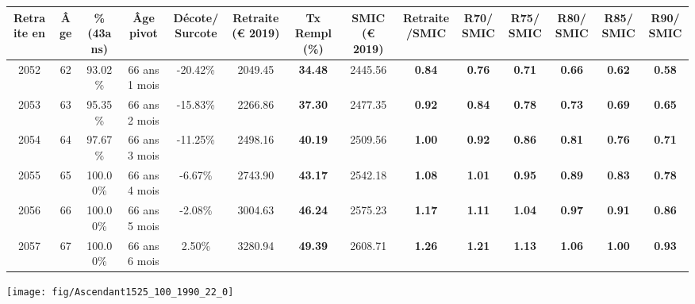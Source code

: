 \begin{adjustbox}{max width=\textwidth} 
\begin{tabular}[htb]{|c|c||c|c|c||c|c||c|c||c|c|c|c|c|} 
\hline 
 Retraite en &  Âge &  \%(43ans) &  Âge pivot &  Décote/Surcote &  Retraite (\euro{} 2019) &  Tx Rempl(\%) &  SMIC (\euro{} 2019) &  Retraite/SMIC &  R70/SMIC &  R75/SMIC &  R80/SMIC &  R85/SMIC &  R90/SMIC \\ 
\hline \hline 
 2052 &  62 &  93.02\% &  66 ans 1 mois &  -20.42\% &  2049.45 &  {\bf 34.48} &  2445.56 &  {\bf {\color{red} 0.84}} &  {\bf {\color{red} 0.76}} &  {\bf {\color{red} 0.71}} &  {\bf {\color{red} 0.66}} &  {\bf {\color{red} 0.62}} &  {\bf {\color{red} 0.58}} \\ 
\hline 
 2053 &  63 &  95.35\% &  66 ans 2 mois &  -15.83\% &  2266.86 &  {\bf 37.30} &  2477.35 &  {\bf {\color{red} 0.92}} &  {\bf {\color{red} 0.84}} &  {\bf {\color{red} 0.78}} &  {\bf {\color{red} 0.73}} &  {\bf {\color{red} 0.69}} &  {\bf {\color{red} 0.65}} \\ 
\hline 
 2054 &  64 &  97.67\% &  66 ans 3 mois &  -11.25\% &  2498.16 &  {\bf 40.19} &  2509.56 &  {\bf {\color{red} 1.00}} &  {\bf {\color{red} 0.92}} &  {\bf {\color{red} 0.86}} &  {\bf {\color{red} 0.81}} &  {\bf {\color{red} 0.76}} &  {\bf {\color{red} 0.71}} \\ 
\hline 
 2055 &  65 &  100.00\% &  66 ans 4 mois &  -6.67\% &  2743.90 &  {\bf 43.17} &  2542.18 &  {\bf 1.08} &  {\bf 1.01} &  {\bf {\color{red} 0.95}} &  {\bf {\color{red} 0.89}} &  {\bf {\color{red} 0.83}} &  {\bf {\color{red} 0.78}} \\ 
\hline 
 2056 &  66 &  100.00\% &  66 ans 5 mois &  -2.08\% &  3004.63 &  {\bf 46.24} &  2575.23 &  {\bf 1.17} &  {\bf 1.11} &  {\bf 1.04} &  {\bf {\color{red} 0.97}} &  {\bf {\color{red} 0.91}} &  {\bf {\color{red} 0.86}} \\ 
\hline 
 2057 &  67 &  100.00\% &  66 ans 6 mois &  2.50\% &  3280.94 &  {\bf 49.39} &  2608.71 &  {\bf 1.26} &  {\bf 1.21} &  {\bf 1.13} &  {\bf 1.06} &  {\bf {\color{red} 1.00}} &  {\bf {\color{red} 0.93}} \\ 
\hline 
\hline 
\end{tabular} 
\end{adjustbox} 
 
 \vspace{0.1cm} 

 {\hspace{-2.2cm}\texttt{[image: fig/Ascendant1525\_100\_1990\_22\_0]}} 

